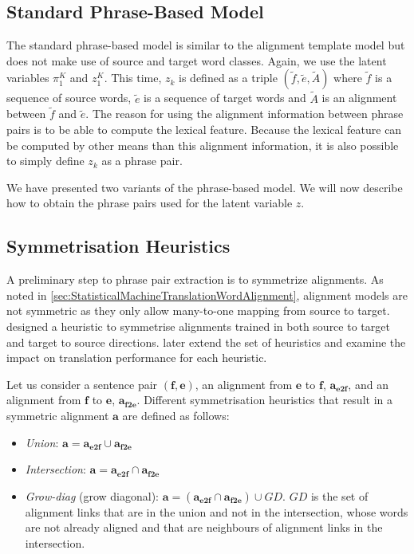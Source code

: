 \subsection{Standard Phrase-Based Model}

The standard phrase-based model is similar to the alignment template
model but does not make use of source and target word classes.
Again, we use the latent variables $\pi_1^K$ and $z_1^K$.
This time, $z_k$ is defined as a triple $(\tilde{f}, \tilde{e}, \tilde{A})$
where $\tilde{f}$ is a sequence of source words, $\tilde{e}$ is a sequence
of target words and $\tilde{A}$ is an alignment between $\tilde{f}$ and $\tilde{e}$.
The reason for using the alignment information between phrase pairs is to be able
to compute the lexical feature. Because the lexical feature can be computed
by other means than this alignment information, it is also possible to simply
define $z_k$ as a phrase pair.

We have presented two variants of the phrase-based model. We will now
describe how to obtain the phrase pairs used for the latent variable $z$.

\subsection{Symmetrisation Heuristics}
\label{sec:symmetrisationHeuristics}

A preliminary step to phrase pair extraction is to symmetrize alignments.
As noted in \autoref{sec:StatisticalMachineTranslationWordAlignment}, alignment
models are not symmetric as they only allow many-to-one mapping from source to
target. \citet{och-tillmann-ney:1999:EMNLP} designed
a heuristic to symmetrise alignments trained in both source to target
and target to source directions. \citet{koehn-och-marcu:2003:NAACL}
later extend the set of heuristics and examine the impact on translation
performance for each heuristic.

Let us consider a sentence pair $(\bm{f}, \bm{e})$,
an alignment
from $\bm{e}$ to $\bm{f}$, $\bm{a_{e2f}}$, and an alignment from $\bm{f}$ to
$\bm{e}$, $\bm{a_{f2e}}$. Different symmetrisation heuristics that result in a
symmetric alignment $\bm{a}$ are defined as follows:
%
\begin{itemize}
  \item \emph{Union}: $\bm{a} = \bm{a_{e2f}} \cup \bm{a_{f2e}}$
  \item \emph{Intersection}: $\bm{a} = \bm{a_{e2f}} \cap \bm{a_{f2e}}$
  \item \emph{Grow-diag} (grow diagonal): $\bm{a} = (\bm{a_{e2f}} \cap \bm{a_{f2e}}) \cup GD$. $GD$ is the set of
    alignment links that are in the union and not in the intersection, whose words are not already aligned and
    that are neighbours of alignment links in the intersection.
\end{itemize}
%


